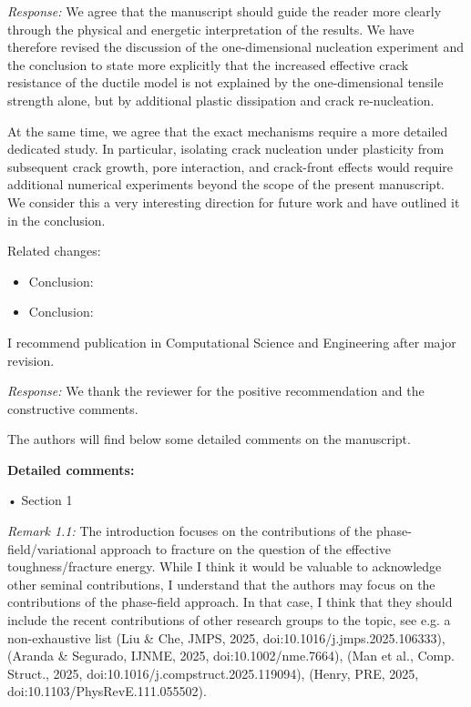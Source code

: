 \documentclass[pdflatex,sn-mathphys-num]{sn-jnl}
\begin{document}
\emph{Response:} We agree that the manuscript should guide the reader more clearly through the physical and energetic interpretation of the results. We have therefore revised the discussion of the one-dimensional nucleation experiment and the conclusion to state more explicitly that the increased effective crack resistance of the ductile model is not explained by the one-dimensional tensile strength alone, but by additional plastic dissipation and crack re-nucleation.

At the same time, we agree that the exact mechanisms require a more detailed dedicated study. In particular, isolating crack nucleation under plasticity from subsequent crack growth, pore interaction, and crack-front effects would require additional numerical experiments beyond the scope of the present manuscript. We consider this a very interesting direction for future work and have outlined it in the conclusion.

Related changes:
\begin{itemize}
\item Conclusion: 
\item Conclusion: 
\end{itemize}

\bigskip

I recommend publication in Computational Science and Engineering after major revision.

\emph{Response:} We thank the reviewer for the positive recommendation and the constructive comments.

\bigskip

The authors will find below some detailed comments on the manuscript.

\bigskip

\textbf{Detailed comments:}

\bigskip

\noindent
• Section 1

\emph{Remark 1.1:} The introduction focuses on the contributions of the phase-field/variational approach to fracture on the question of the effective toughness/fracture energy. While I think it would be valuable to acknowledge other seminal contributions, I understand that the authors may focus on the contributions of the phase-field approach. In that case, I think that they should include the recent contributions of other research groups to the topic, see e.g. a non-exhaustive list (Liu \& Che, JMPS, 2025, doi:10.1016/j.jmps.2025.106333), (Aranda \& Segurado, IJNME, 2025, doi:10.1002/nme.7664), (Man et al., Comp. Struct., 2025, doi:10.1016/j.compstruct.2025.119094), (Henry, PRE, 2025, doi:10.1103/PhysRevE.111.055502).
\end{document}
